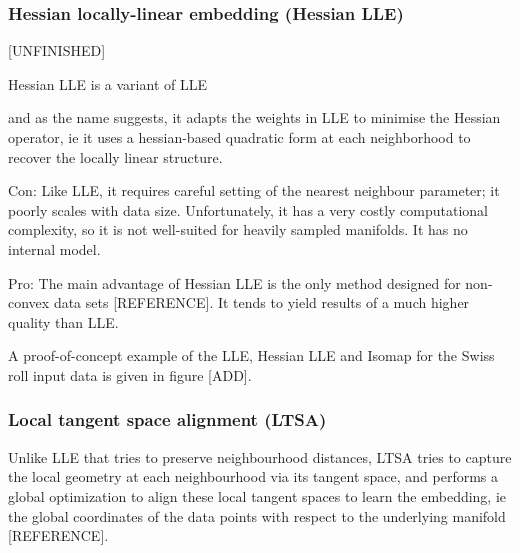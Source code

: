 \hfill
\subsubsection{Hessian locally-linear embedding (Hessian LLE)}
[UNFINISHED]

Hessian LLE is a variant of LLE

and as the name suggests, it adapts the weights in LLE to minimise the Hessian operator, ie it uses a hessian-based quadratic form at each neighborhood to recover the locally linear structure. 

Con: Like LLE, it requires careful setting of the nearest neighbour parameter; it poorly scales with data size.
Unfortunately, it has a very costly computational complexity, so it is not well-suited for heavily sampled manifolds. It has no internal model.

Pro: The main advantage of Hessian LLE is the only method designed for non-convex data sets [REFERENCE].
It tends to yield results of a much higher quality than LLE. 


A proof-of-concept example of the LLE, Hessian LLE and Isomap for the Swiss roll input data is given in figure [ADD].

\hfill
\subsubsection{Local tangent space alignment (LTSA)}

Unlike LLE that tries to preserve neighbourhood distances, LTSA tries to capture the local geometry at each neighbourhood via its tangent space, and performs a global optimization to align these local tangent spaces to learn the embedding, ie the global coordinates of the data points with respect to the underlying manifold [REFERENCE].

